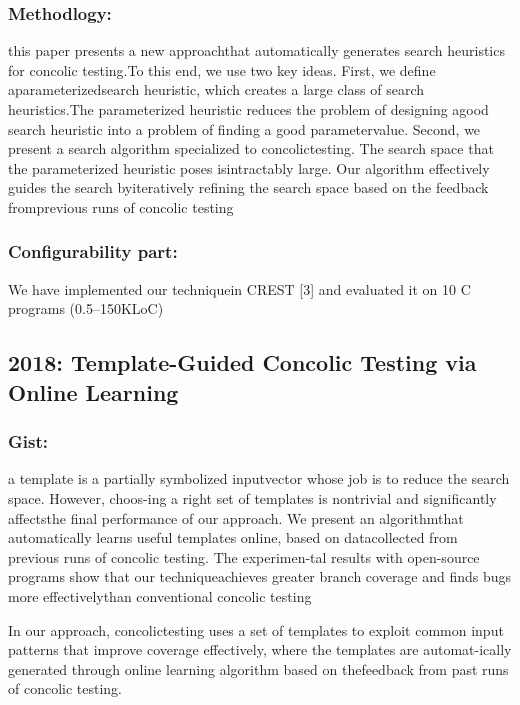 \documentclass[	runningheads,
				a4paper]{llncs}
\begin{document}
\subsubsection{Methodlogy:}
this paper presents a new approachthat automatically generates search heuristics for concolic testing.To this end, we use two key ideas. First, we define aparameterizedsearch heuristic, which creates a large class of search heuristics.The parameterized heuristic reduces the problem of designing agood search heuristic into a problem of finding a good parametervalue. Second, we present a search algorithm specialized to concolictesting. The search space that the parameterized heuristic poses isintractably large. Our algorithm effectively guides the search byiteratively refining the search space based on the feedback fromprevious runs of concolic testing

\subsubsection{Configurability part:}
We have implemented our techniquein CREST [3] and evaluated it on 10 C programs (0.5–150KLoC)

\subsection{2018: Template-Guided Concolic Testing via Online Learning}
\subsubsection{Gist:}
a template is a partially symbolized inputvector whose job is to reduce the search space. However, choos-ing a right set of templates is nontrivial and significantly affectsthe final performance of our approach. We present an algorithmthat automatically learns useful templates online, based on datacollected from previous runs of concolic testing. The experimen-tal results with open-source programs show that our techniqueachieves greater branch coverage and finds bugs more effectivelythan conventional concolic testing

In our approach, concolictesting uses a set of templates to exploit common input patterns that improve coverage effectively, where the templates are automat-ically generated through online learning algorithm based on thefeedback from past runs of concolic testing.
\end{document}
